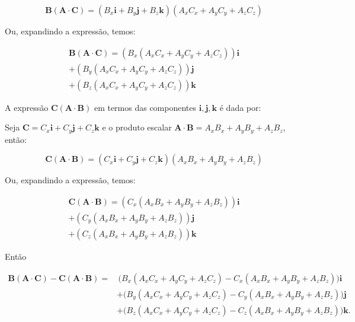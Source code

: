 \documentclass[a4paper,12pt]{article}
\begin{document}
\begin{equation}
\mathbf{B} (\mathbf{A} \cdot \mathbf{C}) = (B_x \mathbf{i} + B_y \mathbf{j} + B_z \mathbf{k}) (A_x C_x + A_y C_y + A_z C_z)
\end{equation}

Ou, expandindo a expressão, temos:

\begin{equation}
    \begin{aligned}
\mathbf{B} (\mathbf{A} \cdot \mathbf{C}) = \left( B_x (A_x C_x + A_y C_y + A_z C_z) \right) \mathbf{i}\\
             + \left( B_y (A_x C_x + A_y C_y + A_z C_z) \right) \mathbf{j}\\
             + \left( B_z (A_x C_x + A_y C_y + A_z C_z) \right) \mathbf{k}
\end{aligned}
\end{equation}

A expressão \( \mathbf{C}(\mathbf{A} \cdot \mathbf{B}) \) em termos das componentes \( \mathbf{i}, \mathbf{j}, \mathbf{k} \) é dada por:

Seja \( \mathbf{C} = C_x \mathbf{i} + C_y \mathbf{j} + C_z \mathbf{k} \) e o produto escalar \( \mathbf{A} \cdot \mathbf{B} = A_x B_x + A_y B_y + A_z B_z \), então:

\begin{equation}
\mathbf{C} (\mathbf{A} \cdot \mathbf{B}) = (C_x \mathbf{i} + C_y \mathbf{j} + C_z \mathbf{k}) (A_x B_x + A_y B_y + A_z B_z)
\end{equation}

Ou, expandindo a expressão, temos:

\begin{equation}
    \begin{aligned}
\mathbf{C} (\mathbf{A} \cdot \mathbf{B}) = \left( C_x (A_x B_x + A_y B_y + A_z B_z) \right) \mathbf{i}\\
        + \left( C_y (A_x B_x + A_y B_y + A_z B_z) \right) \mathbf{j} \\
        + \left( C_z (A_x B_x + A_y B_y + A_z B_z) \right) \mathbf{k}
\end{aligned}
\end{equation}

Ent\~ao


\begin{equation}
    \begin{aligned}
\mathbf{B} (\mathbf{A} \cdot \mathbf{C}) - \mathbf{C} (\mathbf{A} \cdot \mathbf{B}) = & \, \Big( B_x (A_x C_x + A_y C_y + A_z C_z) - C_x (A_x B_x + A_y B_y + A_z B_z) \Big) \mathbf{i} \\
& + \Big( B_y (A_x C_x + A_y C_y + A_z C_z) - C_y (A_x B_x + A_y B_y + A_z B_z) \Big) \mathbf{j} \\
& + \Big( B_z (A_x C_x + A_y C_y + A_z C_z) - C_z (A_x B_x + A_y B_y + A_z B_z) \Big) \mathbf{k}.
    \end{aligned}
\end{equation}
\end{document}
